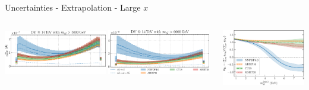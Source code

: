 \documentclass[9pt]{beamer}
\begin{document}
\begin{frame}{Uncertainties - Extrapolation - Large $x$}
\begin{columns}
\begin{column}{0.5\textwidth}
            \begin{tcolorbox}[size=small,sharpish corners,boxrule=0mm]
                \centering
                \includegraphics[width=0.49\textwidth]{NNPDF_DY_14TEV_BSM_AFB_COS_5000}
                \includegraphics[width=0.49\textwidth]{NNPDF_DY_14TEV_BSM_AFB_COS_6000}
            \end{tcolorbox}
        \end{column}
        \begin{column}{0.5\textwidth}
            \begin{tcolorbox}
                \includegraphics[width=\textwidth]{asym_coeff_mlldep}
            \end{tcolorbox}
        \end{column}
    \end{columns}
\end{frame}
\end{document}
